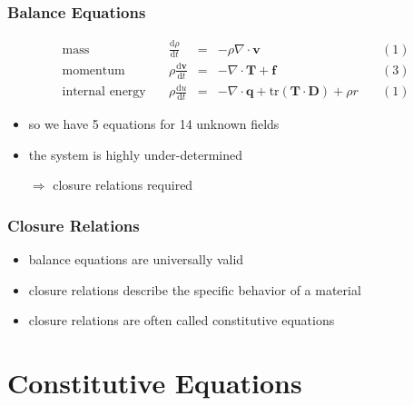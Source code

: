 \documentclass[hide notes,intlimits]{beamer}
\begin{document}
\begin{frame}
  \frametitle{Balance Equations}
  \begin{equation*}
  \begin{array}{lcclc}
    \text{mass} \quad &  \frac{\text{d} \rho}{\text{d} t} & = & -\rho\nabla \cdot \mathbf{v} \quad & (1)\\[.25em]
    \text{momentum} \quad & \rho \frac{\text{d} \mathbf{v}}{\text{d} t} & = & -\nabla \cdot \mathbf{T} + \mathbf{f} \quad & (3) \\[.25em]
    \text{internal energy} \quad & \rho\frac{\text{d} u}{\text{d} t} & = & - \nabla \cdot \mathbf{q} + \text{tr} \left(\mathbf{T}\cdot\mathbf{D}\right) + \rho r\quad & (1)
  \end{array}
  \end{equation*}
  \begin{itemize}
   \item so we have 5 equations for 14 unknown fields
   \item the system is highly under-determined
   \item[$\Rightarrow$] \alert{closure relations} required
 \end{itemize}
\end{frame}



\begin{frame}
  \frametitle{Closure Relations}
  \begin{itemize}
    \item \alert{balance equations} are universally valid
    \item \alert{closure relations} describe the specific behavior of a material
    \item \alert{closure relations} are often called \alert{constitutive equations}
  \end{itemize}
\end{frame}


\section{Constitutive Equations}
\end{document}
